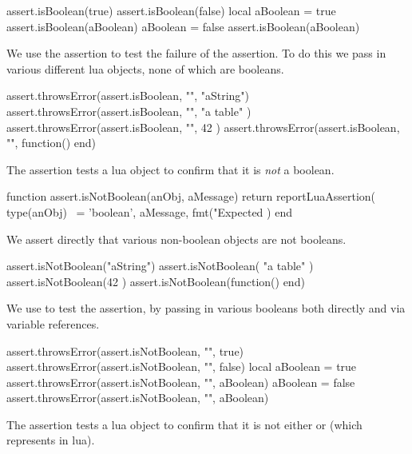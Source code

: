 \startLuaTest
  assert.isBoolean(true)
  assert.isBoolean(false)
  local aBoolean = true
  assert.isBoolean(aBoolean)
  aBoolean = false
  assert.isBoolean(aBoolean)
\stopLuaTest
\stopTestCase


We use the  assertion to test the failure of the 
 assertion. To do this we pass in various different 
lua objects, none of which are booleans. 

\startLuaTest
  assert.throwsError(assert.isBoolean, "", "aString")
  assert.throwsError(assert.isBoolean, "", { "a table" })
  assert.throwsError(assert.isBoolean, "", 42 )
  assert.throwsError(assert.isBoolean, "", function() end)
\stopLuaTest
\stopTestCase

\stopTestSuite


The  assertion tests a lua object to confirm 
that it is \emph{not} a boolean. 

\startLuaCode
function assert.isNotBoolean(anObj, aMessage)
  return reportLuaAssertion(
    type(anObj) ~= 'boolean',
    aMessage,
    fmt("Expected %
  )
end
\stopLuaCode


We assert directly that various non-boolean objects are not booleans. 

\startLuaTest
  assert.isNotBoolean("aString")
  assert.isNotBoolean({ "a table" })
  assert.isNotBoolean(42 )
  assert.isNotBoolean(function() end)
\stopLuaTest
\stopTestCase


We use  to test the  
assertion, by passing in various booleans both directly and via variable 
references. 

\startLuaTest
  assert.throwsError(assert.isNotBoolean, "", true)
  assert.throwsError(assert.isNotBoolean, "", false)
  local aBoolean = true
  assert.throwsError(assert.isNotBoolean, "", aBoolean)
  aBoolean = false
  assert.throwsError(assert.isNotBoolean, "", aBoolean)
\stopLuaTest
\stopTestCase

\stopTestSuite


The  assertion tests a lua object to confirm that it 
is not either  or  (which represents  
in lua). 

